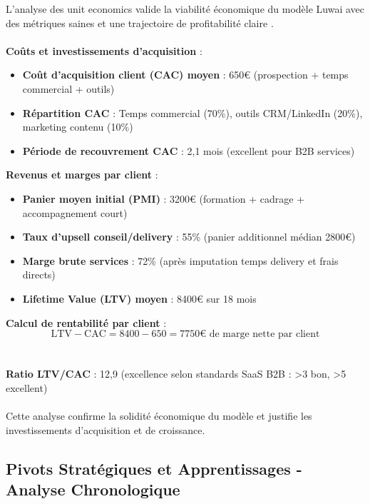 L'analyse des unit economics valide la viabilité économique du modèle Luwai avec des métriques saines et une trajectoire de profitabilité claire \cite{luwai2025economics}.
\\\\
\textbf{Coûts et investissements d'acquisition} :
\begin{itemize}
    \item \textbf{Coût d'acquisition client (CAC) moyen} : 650€ (prospection + temps commercial + outils)
    \item \textbf{Répartition CAC} : Temps commercial (70\%), outils CRM/LinkedIn (20\%), marketing contenu (10\%)
    \item \textbf{Période de recouvrement CAC} : 2,1 mois (excellent pour B2B services)
\end{itemize}
\medskip
\textbf{Revenus et marges par client} :
\begin{itemize}
    \item \textbf{Panier moyen initial (PMI)} : 3200€ (formation + cadrage + accompagnement court)
    \item \textbf{Taux d'upsell conseil/delivery} : 55\% (panier additionnel médian 2800€)
    \item \textbf{Marge brute services} : 72\% (après imputation temps delivery et frais directs)
    \item \textbf{Lifetime Value (LTV) moyen} : 8400€ sur 18 mois
\end{itemize}
\medskip
\textbf{Calcul de rentabilité par client} :
\[
\text{LTV} - \text{CAC} = 8400 - 650 = 7750\text{€ de marge nette par client}
\]
\\\\
\textbf{Ratio LTV/CAC} : 12,9 (excellence selon standards SaaS B2B : >3 bon, >5 excellent)
\\\\
Cette analyse confirme la solidité économique du modèle et justifie les investissements d'acquisition et de croissance.

\subsection{Pivots Stratégiques et Apprentissages - Analyse Chronologique}

